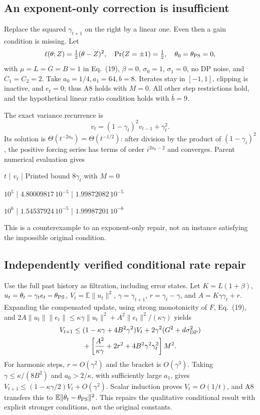 \documentclass[10pt]{article}
\begin{document}
\subsection*{An exponent-only correction is insufficient}
Replace the squared \(\gamma_{t+1}\) on the right by a linear one. Even then a gain condition is missing. Let \[\ell(\theta;Z)=\tfrac12(\theta-Z)^2,\quad
 \Pr(Z=\pm1)=\tfrac12,\quad \theta_0=\theta_{\rm PS}=0,\] with \(\mu=L=G=B=1\) in Eq. (19), \(\beta=0\), \(\sigma_0=1\), \(\sigma_1=0\), no DP noise, and \(C_1=C_2=2\). Take \(a_0=1/4,a_1=64,b=8\). Iterates stay in \([-1,1]\), clipping is inactive, and \(e_t=0\); thus A8 holds with \(M=0\). All other step restrictions hold, and the hypothetical linear ratio condition holds with \(\bar b=9\).\par
The exact variance recurrence is \[v_t=(1-\gamma_t)^2v_{t-1}+\gamma_t^2.\] Its solution is \(\Theta(t^{-2a_0})=\Theta(t^{-1/2})\): after division by the product of \((1-\gamma_i)^2\), the positive forcing series has terms of order \(i^{2a_0-2}\) and converges. Parent numerical evaluation gives\par
\(t\) | \(v_t\) | Printed bound \(8\gamma_t\) with \(M=0\)\par
\(10^5\) | \(4.80009817\,10^{-5}\) | \(1.99872082\,10^{-5}\)\par
\(10^6\) | \(1.54537924\,10^{-5}\) | \(1.99987201\,10^{-6}\)\par
This is a counterexample to an exponent-only repair, not an instance satisfying the impossible original condition.\par
\subsection*{Independently verified conditional rate repair}
Use the full past history as filtration, including error states. Let \(K=L(1+\beta)\), \(u_t=\theta_t-\gamma_te_t-\theta_{\rm PS}\), \(V_t=\mathbb E\|u_t\|^2\), \(\gamma=\gamma_{t+1}\), \(r=\gamma_t-\gamma\), and \(A=K\gamma\gamma_t+r\). Expanding the compensated update, using strong monotonicity of \(F\), Eq. (19), and \(2A\|u_t\|\|e_t\|\le\kappa\gamma\|u_t\|^2+
A^2\|e_t\|^2/(\kappa\gamma)\) yields \[\begin{aligned}
 V_{t+1}\le{}&(1-\kappa\gamma+4B^2\gamma^2)V_t
        +2\gamma^2(G^2+d\sigma_{\rm DP}^2)\\
 &+\left[\frac{A^2}{\kappa\gamma}+2r^2+
                  4B^2\gamma^2\gamma_t^2\right]M^2.\end{aligned}\] For harmonic steps, \(r=O(\gamma^2)\) and the bracket is \(O(\gamma^3)\). Taking \(\gamma\le\kappa/(8B^2)\) and \(a_0>2/\kappa\), with sufficiently large \(a_1\), gives \(V_{t+1}\le(1-\kappa\gamma/2)V_t+O(\gamma^2)\). Scalar induction proves \(V_t=O(1/t)\), and A8 transfers this to \(\mathbb E\|\theta_t-\theta_{\rm PS}\|^2\). This repairs the qualitative conditional result with explicit stronger conditions, not the original constants.\par
\end{document}
